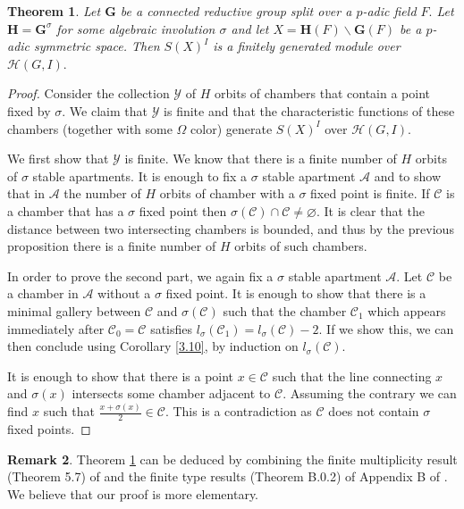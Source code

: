 \documentclass[12pt]{article}
\newcommand{\A}{\mathcal{A}}
\newcommand{\C}{\mathcal{C}}
\newcommand{\<}{\langle}
\renewcommand{\>}{\rangle}
\renewcommand{\emptyset}{\varnothing}
\theoremstyle{plain}
\newtheorem{theorem}{Theorem}[section] %
\theoremstyle{definition}
\newtheorem{Remark}[theorem]{Remark}
\begin{document}
\begin{theorem}\label{finite_generated}
Let $\mathbf{G}$ be a connected reductive group split over a $p$-adic field $F.$ Let $\mathbf{H}=\mathbf{G}^\sigma$ for some algebraic involution $\sigma$ and let $X=\mathbf{H}(F)\backslash \mathbf{G}(F)$ be a $p$-adic symmetric space. Then $S(X)^I$ is a finitely generated module over ${\mathcal H}(G,I).$
\end{theorem}


\begin{proof}
Consider the collection $\mathcal{Y}$ of 
$H$ orbits of chambers that contain a point fixed by $\sigma$. We claim that $\mathcal{Y}$ is finite and that the characteristic functions of these chambers (together with some $\Omega$ color) generate $S(X)^I$ over ${\mathcal H}(G,I).$

We first show that $\mathcal{Y}$ is finite. We know that there is a finite number of $H$ orbits of $\sigma$ stable apartments. It is enough to fix a $\sigma$ stable apartment $\A$ and to show that in $\A$ the number of $H$ orbits of chamber with a $\sigma$ fixed point is finite. If $\C$ is a chamber that has a $\sigma$ fixed point then $\sigma(\C)\cap\C\neq\emptyset$. It is clear that the distance between two intersecting chambers is bounded, and thus by the previous proposition there is a finite number of $H$ orbits of such chambers. 


In order to prove the second part, we again fix a $\sigma$ stable apartment $\A$. Let $\C$ be a chamber in $\A$ without a $\sigma$ fixed point. It is enough to show that there is a minimal gallery between $\C$ and $\sigma(\C)$ such that the chamber $\C_1$ which appears immediately after $\C_0=\C$ satisfies $l_\sigma(\C_1)=l_\sigma(\C)-2$. If we show this, we can then conclude using Corollary \ref{3.10}, by induction on $l_\sigma(\C)$.

It is enough to show that there is a point $x\in \C$ such that the line connecting $x$ and $\sigma(x)$ intersects some chamber adjacent to $\C$. Assuming the contrary we can find $x$ such that $\frac{x+\sigma(x)}{2}\in \C$. This is a contradiction as $\C$ does not contain $\sigma$ fixed points.

\end{proof}


\begin{Remark}
Theorem \ref{finite_generated} can be deduced by combining the finite multiplicity result (Theorem 5.7) of \cite{Delormefinite} and the finite type results (Theorem B.0.2) of Appendix B of \cite{AGS}. We believe that our proof is more elementary.
\end{Remark}
\end{document}
